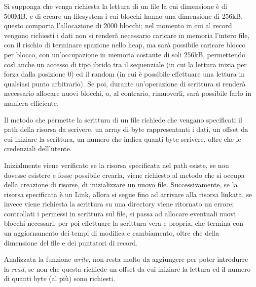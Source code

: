 Si supponga che venga richiesta la lettura di un file la cui dimensione è di 500MB, e di creare un filesystem i cui blocchi hanno una dimensione di 256kB, questo comporta l'allocazione di 2000 blocchi; nel momento in cui al record vengono richiesti i dati non si renderà necessario caricare in memoria l'intero file, con il rischio di terminare spazione nello heap, ma sarà possibile caricare blocco per blocco, con un'occupazione in memoria costante di soli 256kB, permettendo così anche un accesso di tipo ibrido tra il sequenziale (in cui la lettura inizia per forza dalla posizione 0) ed il random (in cui è possibile effettuare una lettura in qualsiasi punto arbitrario). Se poi, durante un'operazione di scrittura si renderà necessario allocare nuovi blocchi, o, al contrario, rimuoverli, sarà possibile farlo in maniera efficiente.

Il metodo che permette la scrittura di un file richiede che vengano specificati il path della risorsa da scrivere, un array di byte rappresentanti i dati, un offset da cui iniziare la scrittura, un numero che indica quanti byte scrivere, oltre che le credenziali dell'utente.

Inizialmente viene verificato se la risorsa specificata nel path esiste, se non dovesse esistere e fosse possibile crearla, viene richiesto al metodo che si occupa della creazione di risorse, di inizializzare un nuovo file. Successivamente, se la risorsa specificata è un Link, allora si segue fino ad arrivare alla risorsa linkata, se invece viene richiesta la scrittura su una directory viene ritornato un errore; controllati i permessi in scrittura sul file, si passa ad allocare eventuali nuovi blocchi necessari, per poi effettuare la scrittura vera e propria, che termina con un aggiornamento dei tempi di modifica e cambiamento, oltre che della dimensione del file e dei puntatori di record.

Analizzata la funzione \emph{write}, non resta molto da aggiungere per poter introdurre la \emph{read}, se non che questa richiede un offset da cui iniziare la lettura ed il numero di quanti byte (al più) sono richiesti.

